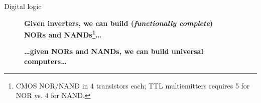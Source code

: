 \documentclass[mathserif,xcolor={dvipsnames,table}]{beamer}
\begin{document}
\begin{frame}{Digital logic}
\begin{figure}
\begin{center}
\end{center}
\scriptsize{\textbf{Given inverters, we can build (\textit{functionally complete}) NORs and NANDs\footnote{\tiny{CMOS NOR/NAND in 4 transistors each; TTL multiemitters requires 5 for NOR vs. 4 for NAND.}}\ldots}}
\end{figure}
\begin{figure}
\begin{center}
\end{center}
\scriptsize{\textbf{\ldots given NORs and NANDs, we can build universal computers\ldots}}
\end{figure}


\end{frame}
\end{document}
